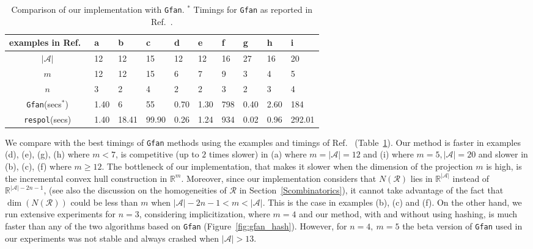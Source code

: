 \documentclass{article}
\newcommand\refcite[1]{\citealp{#1}} \newcommand\citess[1]{\textsuperscript{\textup{\citealp{#1}}}}
\def\RR{{\mathbb R}} \def\ZZ{{\mathbb Z}}
\def\A{{\mathcal A}} \def\R{{\mathcal R}}
\begin{document}
\begin{table}[h!]\footnotesize \centering \begin{tabular}{c|lll|llllll}
examples in Ref.~\refcite{JensenYu11}
                              &  a  &  b  &  c &  d &  e &  f &  g &  h & i \\
\hline
\(|\A|\)                      & 12  & 12  & 15 & 12 & 12 & 16 & 27 & 16 & 20\\
\( m  \)                      & 12  & 12  & 15 &  6 &  7 &  9 &  3 &  4 &  5\\
\( n  \)                      &  3  &  2  &  4 &  2 &  2 &  3 &  2 &  3 &  4\\
\texttt{Gfan}(secs$^*$)
                              &1.40 & 6   & 55 &0.70&1.30&798 &0.40&2.60&184 \\
\texttt{respol}(secs)  & 1.40&18.41 &99.90&0.26&1.24& 934&0.02&0.96&292.01\\
\end{tabular}
\caption{Comparison of our implementation with \texttt{Gfan}.
$^*$ Timings for \texttt{Gfan} as reported in Ref.~\protect\refcite{JensenYu11}.
\label{TComparisonGFAN}}
\end{table}


We compare with the best timings of {\tt Gfan} methods using the examples
and timings of Ref.~\refcite{JensenYu11} (Table~\ref{TComparisonGFAN}).
Our method is faster in examples (d), (e), (g), (h) where $m<7$, is
competitive (up to $2$ times slower) in (a) where $m=|\A|=12$ and (i) where
$m=5,|\A|=20$ and slower in (b), (c), (f) where $m\geq12$. The bottleneck of our
implementation, that makes it slower when the dimension of the projection $m$ is
high, is the incremental convex hull construction in $\RR^m$. 
Moreover, since our implementation considers that $N(\R)$ lies in
$\RR^{|\A|}$ instead of $\RR^{|\A|-2n-1}$, (see also the discussion on the
homogeneities of $\R$ in Section~\ref{Scombinatorics}),
it cannot  take advantage of the fact that
$\dim(N(\R))$ could be less than $m$ when $|\A|-2n-1 < m < |\A|$. 
This is the case in examples (b), (c) and
(f).
On the other hand, we run extensive experiments for $n=3$, considering
implicitization, where $m=4$ and
our method, with and without using hashing, is much faster than
any of the two algorithms based on \texttt{Gfan} (Figure~\ref{fig:gfan_hash}).
However, for $n=4,\ m=5$ the beta version of \texttt{Gfan} used in our experiments was not
stable and always crashed when \(|\A|>13\).
\end{document}
